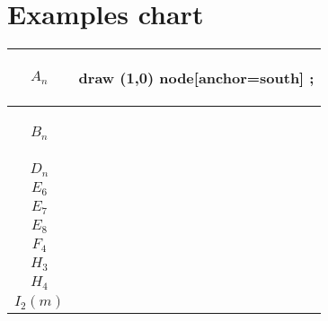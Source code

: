 \documentclass[12pt,a4paper]{article}
\author{Giulio Rasi}
\newcommand{\wycompletetable}{\begin{tabular}{|c|c|}
\hline 
$A_n$ & 

 \begin{wythoff}
\wyAndotslabs draw (1,0) node[anchor=south] {\phantom{$1$}}; 
\end{wythoff}
\\ 
\hline 
$B_n$ & \begin{wythoff} \wyBndotslabs \  \end{wythoff} \\ 
\hline 

$D_n$ & \begin{wythoff} \wyDndotslabs \end{wythoff} \\ 
\hline 
$E_6$ & \begin{wythoff} \wyEnlabs{6} \end{wythoff} \\ 
\hline 
$E_7$ & \begin{wythoff} \wyEnlabs{7}  \end{wythoff} \\ 
\hline 
$E_8$ & \begin{wythoff} \wyEnlabs{8} \end{wythoff} \\ 
\hline 
$F_4$ & \begin{wythoff} \wyFlabs \end{wythoff} \\
 \hline
$H_3$ & \begin{wythoff} \wyHnlabs{3} \end{wythoff}\\
 \hline
$H_4$ &\begin{wythoff} \wyHnlabs{4} \end{wythoff} \\
 \hline
 
$I_2(m)$ &\begin{wythoff} \wyImlabs{m} \end{wythoff} \\
\hline
\end{tabular} }
\begin{document}
\section{Examples chart}

\wycompletetable
\end{document}
